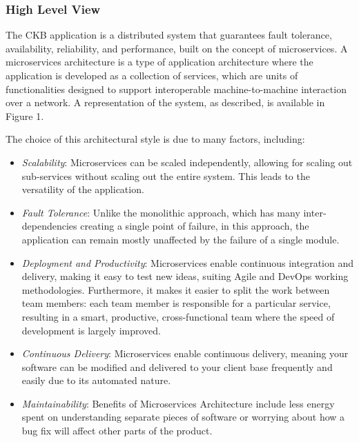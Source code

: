\subsubsection{High Level View}
The CKB application is a distributed system that guarantees fault tolerance, availability, reliability, and performance, built on the concept of microservices. A microservices architecture is a type of application architecture where the application is developed as a collection of services, which are units of functionalities designed to support interoperable machine-to-machine interaction over a network. A representation of the system, as described, is available in Figure 1. \par

The choice of this architectural style is due to many factors, including:

\begin{itemize}
    \item \textit{Scalability}: Microservices can be scaled independently, allowing for scaling out sub-services without scaling out the entire system. This leads to the versatility of the application.
    
    \item \textit{Fault Tolerance}: Unlike the monolithic approach, which has many inter-dependencies creating a single point of failure, in this approach, the application can remain mostly unaffected by the failure of a single module.
    
    \item \textit{Deployment and Productivity}: Microservices enable continuous integration and delivery, making it easy to test new ideas, suiting Agile and DevOps working methodologies. Furthermore, it makes it easier to split the work between team members: each team member is responsible for a particular service, resulting in a smart, productive, cross-functional team where the speed of development is largely improved.
    
    \item \textit{Continuous Delivery}: Microservices enable continuous delivery, meaning your software can be modified and delivered to your client base frequently and easily due to its automated nature.
    
    \item \textit{Maintainability}: Benefits of Microservices Architecture include less energy spent on understanding separate pieces of software or worrying about how a bug fix will affect other parts of the product.
\end{itemize}

